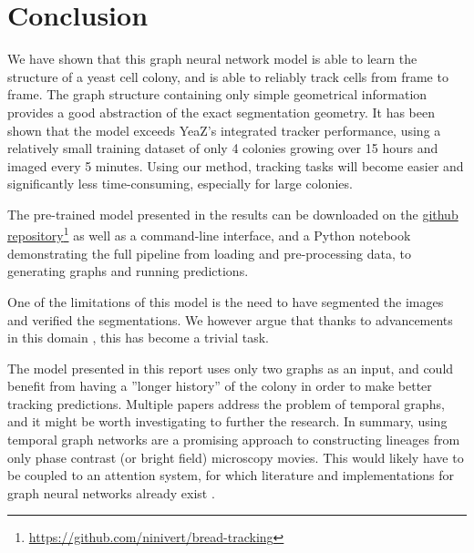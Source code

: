 \documentclass[10pt,conference,compsocconf,a4paper]{IEEEtran}
\begin{document}
\section{Conclusion}

	We have shown that this graph neural network model is able to learn the structure of a yeast cell colony, and is able to reliably track cells from frame to frame. The graph structure containing only simple geometrical information provides a good abstraction of the exact segmentation geometry. It has been shown that the model exceeds YeaZ's integrated tracker performance, using a relatively small training dataset of only 4 colonies growing over 15 hours and imaged every 5 minutes. Using our method, tracking tasks will become easier and significantly less time-consuming, especially for large colonies.
	
	The pre-trained model presented in the results can be downloaded on the \href{https://github.com/ninivert/bread-tracking}{github repository}\footnote{\href{https://github.com/ninivert/bread-tracking}{https://github.com/ninivert/bread-tracking}} as well as a command-line interface, and a Python notebook demonstrating the full pipeline from loading and pre-processing data, to generating graphs and running predictions.

	One of the limitations of this model is the need to have segmented the images and verified the segmentations. We however argue that thanks to advancements in this domain \cite{dietler_convolutional_2020,stringer_cellpose_2020}, this has become a trivial task. 

	The model presented in this report uses only two graphs as an input, and could benefit from having a ''longer history'' of the colony in order to make better tracking predictions. Multiple papers \cite{singer_node_2019,jin_recurrent_2020,rossi_temporal_2020} address the problem of temporal graphs, and it might be worth investigating to further the research.
	In summary, using temporal graph networks are a promising approach to constructing lineages from only phase contrast (or bright field) microscopy movies. This would likely have to be coupled to an attention system, for which literature and implementations for graph neural networks already exist \cite{velickovic_graph_2018,brody_how_2021}.
	
\end{document}
